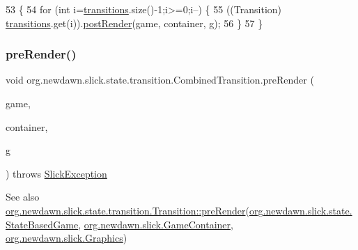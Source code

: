 \begin{DoxyCode}
53                                                                                                            
      \{
54         \textcolor{keywordflow}{for} (\textcolor{keywordtype}{int} i=\mbox{\hyperlink{classorg_1_1newdawn_1_1slick_1_1state_1_1transition_1_1_combined_transition_a4fea111ea283a26351cb164e389ebbbf}{transitions}}.size()-1;i>=0;i--) \{
55             ((Transition) \mbox{\hyperlink{classorg_1_1newdawn_1_1slick_1_1state_1_1transition_1_1_combined_transition_a4fea111ea283a26351cb164e389ebbbf}{transitions}}.get(i)).\mbox{\hyperlink{classorg_1_1newdawn_1_1slick_1_1state_1_1transition_1_1_combined_transition_a31b265b22a85d140c70135142e499a81}{postRender}}(game, container, g);
56         \}
57     \}
\end{DoxyCode}
\mbox{\label{classorg_1_1newdawn_1_1slick_1_1state_1_1transition_1_1_combined_transition_ae98ecdbd92ff9280e4d1c7a9cb2c52a4}} 
\subsubsection{\texorpdfstring{pre\+Render()}{preRender()}}
{\footnotesize\ttfamily void org.\+newdawn.\+slick.\+state.\+transition.\+Combined\+Transition.\+pre\+Render (\begin{DoxyParamCaption}\item[{\mbox{\hyperlink{classorg_1_1newdawn_1_1slick_1_1state_1_1_state_based_game}{State\+Based\+Game}}}]{game,  }\item[{\mbox{\hyperlink{classorg_1_1newdawn_1_1slick_1_1_game_container}{Game\+Container}}}]{container,  }\item[{\mbox{\hyperlink{classorg_1_1newdawn_1_1slick_1_1_graphics}{Graphics}}}]{g }\end{DoxyParamCaption}) throws \mbox{\hyperlink{classorg_1_1newdawn_1_1slick_1_1_slick_exception}{Slick\+Exception}}\hspace{0.3cm}{\ttfamily [inline]}}

\begin{DoxySeeAlso}{See also}
\mbox{\hyperlink{interfaceorg_1_1newdawn_1_1slick_1_1state_1_1transition_1_1_transition_ab8b0668c059830d938575d1a0b08bd93}{org.\+newdawn.\+slick.\+state.\+transition.\+Transition\+::pre\+Render}}(\mbox{\hyperlink{classorg_1_1newdawn_1_1slick_1_1state_1_1_state_based_game}{org.\+newdawn.\+slick.\+state.\+State\+Based\+Game}}, \mbox{\hyperlink{classorg_1_1newdawn_1_1slick_1_1_game_container}{org.\+newdawn.\+slick.\+Game\+Container}}, \mbox{\hyperlink{classorg_1_1newdawn_1_1slick_1_1_graphics}{org.\+newdawn.\+slick.\+Graphics}}) 
\end{DoxySeeAlso}


